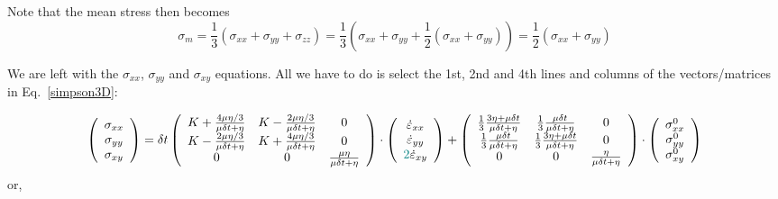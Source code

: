 Note that the mean stress then becomes
\[
\sigma_m 
= \frac{1}{3}(\sigma_{xx}+\sigma_{yy}+\sigma_{zz})
= \frac{1}{3}(\sigma_{xx}+\sigma_{yy}+\frac12(\sigma_{xx}+\sigma_{yy}))
= \frac{1}{2}(\sigma_{xx}+\sigma_{yy})
\]


We are left with the $\sigma_{xx}$, $\sigma_{yy}$ and $\sigma_{xy}$
equations. All we have to do is select the 1st, 2nd and 4th lines and 
columns of the vectors/matrices in Eq.~\eqref{simpson3D}:

\[
\left(
\begin{array}{c}
\sigma_{xx}\\ 
\sigma_{yy}\\ 
\sigma_{xy} 
\end{array}
\right)
=
\delta t
\left(
\begin{array}{ccc}
K + \frac{4\mu \eta/3}{\mu \delta t + \eta} &
K - \frac{2\mu \eta/3}{\mu \delta t + \eta} &
0 \\
K - \frac{2\mu \eta/3}{\mu \delta t + \eta} &
K + \frac{4\mu \eta/3}{\mu \delta t + \eta} &
0  \\
0 & 0 & \frac{\mu \eta }{\mu \delta t + \eta}  \\
\end{array}
\right)
\cdot
\left(
\begin{array}{c}
\dot\varepsilon_{xx}\\ 
\dot\varepsilon_{yy}\\ 
{\color{teal}2}\dot\varepsilon_{xy} 
\end{array}
\right) 
+
\left(
\begin{array}{cccccc}
\frac13\frac{3\eta + \mu \delta t}{\mu\delta t+\eta} & 
\frac13\frac{\mu \delta t}{\mu\delta t+\eta} & 
0\\
\frac13\frac{\mu \delta t}{\mu\delta t+\eta} & 
\frac13\frac{3\eta + \mu \delta t}{\mu\delta t+\eta} & 
0\\
0 & 0 & \frac{ \eta}{\mu\delta t + \eta}  
\end{array}
\right)
\cdot
\left(
\begin{array}{c}
\sigma_{xx}^0\\ 
\sigma_{yy}^0\\ 
\sigma_{xy}^0 
\end{array}
\right) 
\]
or,

